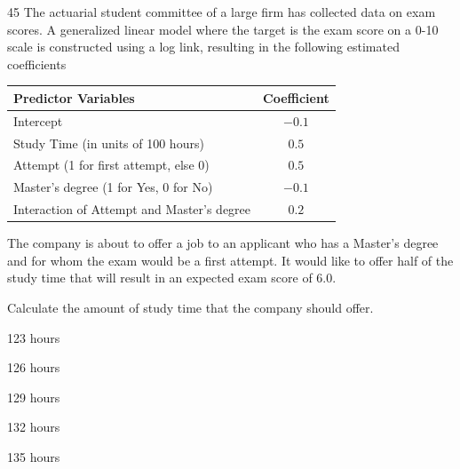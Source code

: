 \begin{question}{45}
The actuarial student committee of a large firm has collected data on exam scores. A generalized linear model where the target is the exam score on a 0-10 scale is constructed using a log link, resulting in the following estimated coefficients

\begin{center}
\begin{tabular}{|l|c|}
\hline
Predictor Variables & Coefficient \\ \hline
Intercept & $-0.1$ \\ \hline
Study Time (in units of 100 hours) & $0.5$ \\ \hline
Attempt (1 for first attempt, else 0) & $0.5$ \\ \hline
Master's degree (1 for Yes, 0 for No) & $-0.1$ \\ \hline
Interaction of Attempt and Master's degree & $0.2$ \\ \hline
\end{tabular}
\end{center}

The company is about to offer a job to an applicant who has a Master's degree and for whom the exam would be a first attempt. It would like to offer half of the study time that will result in an expected exam score of 6.0.

Calculate the amount of study time that the company should offer.

\begin{choices}
\item 123 hours
\item 126 hours
\item 129 hours
\item 132 hours
\item 135 hours
\end{choices}
\end{question}

